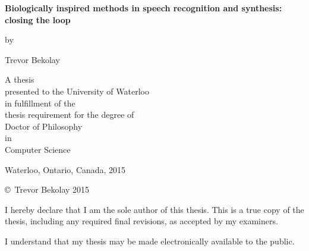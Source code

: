 \pagestyle{empty}

\begin{titlepage}
  \begin{center}
    \vspace*{1.0cm}

    \Huge
    {\bf Biologically inspired methods in speech recognition and synthesis: \\
    closing the loop}

    \vspace*{1.0cm}

    \normalsize
    by \\

    \vspace*{1.0cm}

    \Large
    Trevor Bekolay \\

    \vspace*{3.0cm}

    \normalsize
    A thesis \\
    presented to the University of Waterloo \\
    in fulfillment of the \\
    thesis requirement for the degree of \\
    Doctor of Philosophy \\
    in \\
    Computer Science \\

    \vspace*{2.0cm}

    Waterloo, Ontario, Canada, 2015 \\

    \vspace*{1.0cm}

    \copyright\ Trevor Bekolay 2015 \\
  \end{center}
\end{titlepage}

\pagestyle{plain}
\setcounter{page}{2}

\cleardoublepage

\noindent
I hereby declare that I am the sole author of this thesis. This is a
true copy of the thesis, including any required final revisions, as
accepted by my examiners.

\bigskip

\noindent
I understand that my thesis may be made electronically available to
the public.

\cleardoublepage
